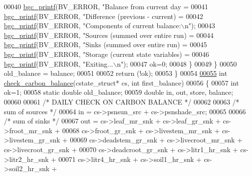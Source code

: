 \begin{DoxyCode}
{00040             \hyperlink{bgc__io_8c_af287cce6e2aede1ce337de9319e80d0d}{bgc\_printf}(BV\_ERROR, \textcolor{stringliteral}{"Balance from current day  = %
00041             \hyperlink{bgc__io_8c_af287cce6e2aede1ce337de9319e80d0d}{bgc\_printf}(BV\_ERROR, \textcolor{stringliteral}{"Difference (previous - current) = %
00042             \hyperlink{bgc__io_8c_af287cce6e2aede1ce337de9319e80d0d}{bgc\_printf}(BV\_ERROR, \textcolor{stringliteral}{"Components of current balance:\(\backslash\)n"});
00043             \hyperlink{bgc__io_8c_af287cce6e2aede1ce337de9319e80d0d}{bgc\_printf}(BV\_ERROR, \textcolor{stringliteral}{"Sources (summed over entire run)  = %
00044             \hyperlink{bgc__io_8c_af287cce6e2aede1ce337de9319e80d0d}{bgc\_printf}(BV\_ERROR, \textcolor{stringliteral}{"Sinks   (summed over entire run)  = %
00045             \hyperlink{bgc__io_8c_af287cce6e2aede1ce337de9319e80d0d}{bgc\_printf}(BV\_ERROR, \textcolor{stringliteral}{"Storage (current state variables) = %
00046             \hyperlink{bgc__io_8c_af287cce6e2aede1ce337de9319e80d0d}{bgc\_printf}(BV\_ERROR, \textcolor{stringliteral}{"Exiting...\(\backslash\)n"});
00047             ok=0;
00048         \}
00049     \}
00050     old\_balance = balance;
00051     
00052     \textcolor{keywordflow}{return} (!ok);
00053 \}
00054 
\hypertarget{check__balance_8c_source_l00055}{}\hyperlink{check__balance_8c_adf0fd12860935512d2a5f628e87c1171}{00055} \textcolor{keywordtype}{int} \hyperlink{check__balance_8c_adf0fd12860935512d2a5f628e87c1171}{check\_carbon\_balance}(cstate\_struct* cs, \textcolor{keywordtype}{int} first\_balance)
00056 \{
00057     \textcolor{keywordtype}{int} ok=1;
00058     \textcolor{keyword}{static} \textcolor{keywordtype}{double} old\_balance;
00059     \textcolor{keywordtype}{double} in, out, store, balance;
00060     
00061     \textcolor{comment}{/* DAILY CHECK ON CARBON BALANCE */}
00062     
00063     \textcolor{comment}{/* sum of sources */}
00064     in = cs->psnsun\_src + cs->psnshade\_src;
00065     
00066     \textcolor{comment}{/* sum of sinks */}
00067     out = cs->leaf\_mr\_snk + cs->leaf\_gr\_snk + cs->froot\_mr\_snk + 
00068         cs->froot\_gr\_snk + cs->livestem\_mr\_snk + cs->livestem\_gr\_snk + 
00069         cs->deadstem\_gr\_snk + cs->livecroot\_mr\_snk + cs->livecroot\_gr\_snk + 
00070         cs->deadcroot\_gr\_snk + cs->litr1\_hr\_snk + cs->litr2\_hr\_snk + 
00071         cs->litr4\_hr\_snk + cs->soil1\_hr\_snk + cs->soil2\_hr\_snk + 
}}}}}}
\end{DoxyCode}
